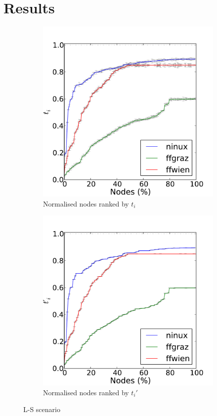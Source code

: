 \documentclass[a4paper,11pt,twoside,openright]{memoir}
\begin{document}
\section{Results}\label{signalling-results}

\begin{figure}[htb]
  \centering
  \begin{subfigure}[b]{0.49\textwidth}
    \includegraphics{graphs/all-batman-Tc}
    \caption{Normalised nodes ranked by $t_i$}
    \label{fig:mp_ls_t}
  \end{subfigure}
  \begin{subfigure}[b]{0.49\textwidth}
    \includegraphics{graphs/all-batman-Rc}
    \caption{Normalised nodes ranked by $t_i'$}
    \label{fig:mp_ls_r}
  \end{subfigure}
  \caption{L-S scenario}
  \label{fig:mp_ls}
\end{figure}
\end{document}

